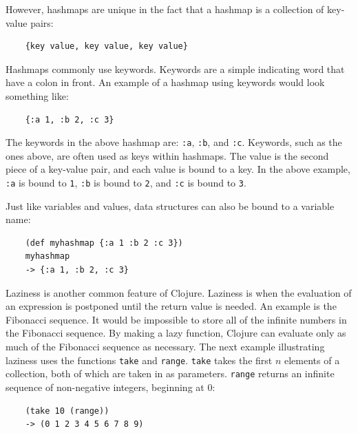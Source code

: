\documentclass[12pt]{article}
\newcommand{\comment}[1]{{\bf \tt  {#1}}}
\newcommand{\emcomment}[1]{\textcolor{ForestGreen}{\comment{Elena: {#1}}}}
\begin{document}
However, hashmaps are unique in the fact that a hashmap is a collection of key-value pairs: 
\begin{verbatim}
	{key value, key value, key value}
\end{verbatim}

Hashmaps commonly use keywords. Keywords are a simple indicating word that have a colon in front.
An example of a hashmap using keywords would look something like: 
\begin{verbatim}
	{:a 1, :b 2, :c 3}
\end{verbatim}

The keywords in the above hashmap are: \texttt{:a}, \texttt{:b}, and \texttt{:c}. Keywords, such as the
ones above, are often used as keys within hashmaps. The value is the second piece of a key-value pair,
and each value is bound to a key. In the above example, \texttt{:a} is bound to \texttt{1},
\texttt{:b} is bound to \texttt{2}, and \texttt{:c} is bound to \texttt{3}.

Just like variables and values, data structures can also be bound to a
variable name: 
\begin{verbatim}
	(def myhashmap {:a 1 :b 2 :c 3})
	myhashmap
	-> {:a 1, :b 2, :c 3}
\end{verbatim}

Laziness is another common feature of Clojure. Laziness is when the evaluation of an expression is
postponed until the return value is needed. An example is the Fibonacci sequence.
It would be impossible to store all of the infinite numbers in the Fibonacci sequence. By making a lazy
function, Clojure can
evaluate only as much of the Fibonacci sequence as necessary. The next example illustrating laziness uses the functions 
\texttt{take} and \texttt{range}. \texttt{take} takes the first $n$ elements of a collection, both of
which are taken in as parameters. \texttt{range} returns an infinite sequence of non-negative
integers, beginning at 0:
\begin{verbatim}
	(take 10 (range))
	-> (0 1 2 3 4 5 6 7 8 9)
\end{verbatim}
\end{document}
